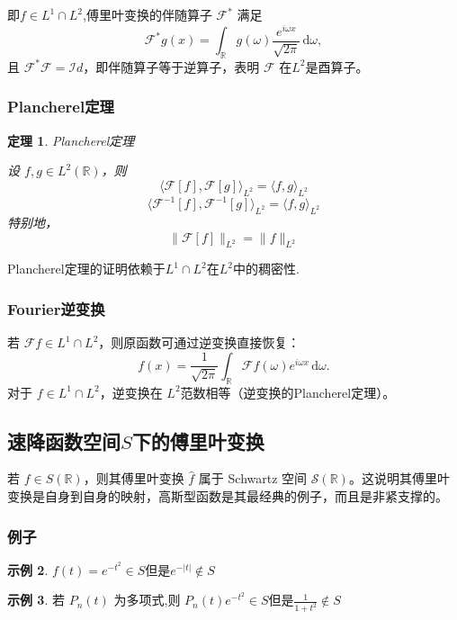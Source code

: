 \documentclass[12pt,a4paper]{article}
\theoremstyle{plain}
\newtheorem{theorem}{定理}[section]
\theoremstyle{definition}
\newtheorem{example}[theorem]{示例}
\theoremstyle{remark}
\begin{document}
即\( f \in L^1 \cap L^2 \),傅里叶变换的伴随算子 \( \mathcal{F}^* \) 满足
\[
\mathcal{F}^* g(x) = \int_{\mathbb{R}} g(\omega) \frac{e^{i\omega x}}{\sqrt{2\pi}} \, \mathrm{d}\omega,
\]
且 \( \mathcal{F}^* \mathcal{F} = \mathcal{I}d \)，即伴随算子等于逆算子，表明 \( \mathcal{F} \) 在$L^2$是酉算子。

\subsubsection{Plancherel定理}
\begin{theorem}Plancherel定理
	
	设 \( f, g \in L^2(\mathbb{R}) \)，则
	\[
	\langle \mathcal{F}[f], \mathcal{F}[g] \rangle_{L^2} = \langle f, g \rangle_{L^2}
	\]
	\[
	\langle \mathcal{F}^{-1}[f], \mathcal{F}^{-1}[g] \rangle_{L^2} = \langle f, g \rangle_{L^2}
	\]
特别地，
\[
\| \mathcal{F}[f] \|_{L^2} = \| f \|_{L^2}
\]
\end{theorem}
Plancherel定理的证明依赖于$L^1\cap L^2$在$L^2$中的稠密性.


\subsubsection{Fourier逆变换}
若 \( \mathcal{F}f \in L^1 \cap L^2 \)，则原函数可通过逆变换直接恢复：
\[
f(x) = \frac{1}{\sqrt{2\pi}} \int_{\mathbb{R}} \mathcal{F}f(\omega) e^{i\omega x} \, \mathrm{d}\omega.
\]
对于 \( f \in L^1 \cap L^2 \)，逆变换在 \( L^2 \)范数相等（逆变换的Plancherel定理）。







\subsection{速降函数空间$S$下的傅里叶变换}
若 $f \in S(\mathbb{R})$，则其傅里叶变换 $\hat{f}$ 属于 Schwartz 空间 $\mathcal{S}(\mathbb{R})$。这说明其傅里叶变换是自身到自身的映射，高斯型函数是其最经典的例子，而且是非紧支撑的。

\subsubsection{例子}
\begin{example}
\(f(t)=e^{-t^{2}} \in S \)但是\(e^{-|t|} \notin S\)
\end{example}

\begin{example}
若 \(P_{n}(t)\) 为多项式,则 \(P_{n}(t)e^{-t^{2}} \in S\)但是\(\frac{1}{1 + t^{2}} \notin S\)
\end{example}
\end{document}
